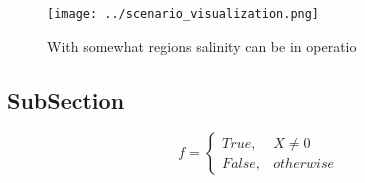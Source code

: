 \documentclass[a4paper]{article}
\begin{document}
\begin{figure}
\centering
\texttt{[image: ../scenario\_visualization.png]}
\caption{With somewhat regions salinity can be in operatio
}
\end{figure}
 
\subsection{SubSection}

\begin{equation}   f =
\begin{cases} True, & X \neq 0\\
False, & otherwise
\end{cases}
\end{equation}
\end{document}
